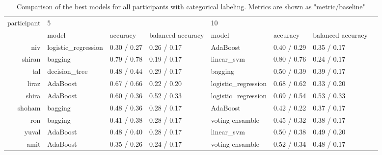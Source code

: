 \documentclass[../main.tex]{subfiles}
\begin{document}
\begin{table}[!h]
    \begin{tabular}{rlllllll}
        \toprule
        participant &  \multicolumn{3}{l}{5} & \multicolumn{3}{l}{10} \\
              &                 model &     accuracy & balanced accuracy &                model &     accuracy & balanced accuracy \\
        \midrule
             niv &  logistic\_regression &  0.30 / 0.27 &       0.26 / 0.17 &             AdaBoost &  0.40 / 0.29 &       0.35 / 0.17 \\
          shiran &              bagging &  0.79 / 0.78 &       0.19 / 0.17 &           linear\_svm &  0.80 / 0.76 &       0.24 / 0.17 \\
             tal &        decision\_tree &  0.48 / 0.44 &       0.29 / 0.17 &              bagging &  0.50 / 0.39 &       0.39 / 0.17 \\
           liraz &             AdaBoost &  0.67 / 0.66 &       0.22 / 0.20 &  logistic\_regression &  0.68 / 0.62 &       0.33 / 0.20 \\
           shira &             AdaBoost &  0.60 / 0.36 &       0.52 / 0.33 &  logistic\_regression &  0.69 / 0.54 &       0.53 / 0.33 \\
          shoham &              bagging &  0.48 / 0.36 &       0.28 / 0.17 &             AdaBoost &  0.42 / 0.22 &       0.37 / 0.17 \\
             ron &              bagging &  0.41 / 0.38 &       0.28 / 0.17 &      voting ensamble &  0.45 / 0.32 &       0.38 / 0.17 \\
           yuval &             AdaBoost &  0.48 / 0.40 &       0.28 / 0.17 &           linear\_svm &  0.50 / 0.38 &       0.49 / 0.20 \\
            amit &             AdaBoost &  0.35 / 0.26 &       0.24 / 0.17 &      voting ensamble &  0.52 / 0.34 &       0.48 / 0.17 \\
        \bottomrule
    \end{tabular}
    \caption{Comparison of the best models for all participants with categorical labeling. Metrics are shown as "metric/baseline"}
\end{table}
\end{document}
